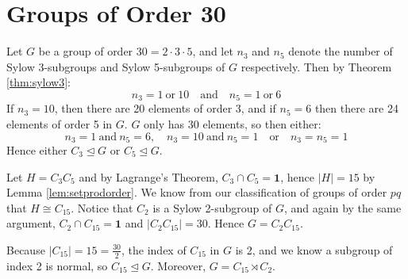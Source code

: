 \documentclass[a4paper, oneside, 12pt, final]{article}
\theoremstyle{definition}
\begin{document}
\section{Groups of Order 30}
Let \(G\) be a group of order \(30 = 2 \cdot 3 \cdot 5\), and let \(n_3\) and \(n_5\) denote the number of Sylow 3-subgroups and Sylow 5-subgroups of \(G\) respectively.
Then by Theorem \ref{thm:sylow3}:
\[n_3 = 1 \ \text{or} \ 10 \quad \text{and} \quad n_5 = 1 \ \text{or} \ 6\]
If \(n_3 = 10\), then there are 20 elements of order 3, and if \(n_5 = 6\) then there are 24 elements of order 5 in \(G\).
\(G\) only has 30 elements, so then either:
\[n_3 = 1 \ \text{and} \ n_5 = 6, \quad n_3 = 10 \ \text{and} \ n_5 = 1 \quad \text{or} \quad n_3 = n_5 = 1\]
Hence either \(C_3 \unlhd G\) or \(C_5 \unlhd G\).

Let \(H = C_3C_5\) and by Lagrange's Theorem, \(C_3 \cap C_5 = \bm{1}\), hence \(|H| = 15\) by Lemma \ref{lem:setprodorder}.
We know from our classification of groups of order \(pq\) that \(H \cong C_{15}\).
Notice that \(C_2\) is a Sylow 2-subgroup of \(G\), and again by the same argument, \(C_2 \cap C_{15} = \bm{1}\) and \(|C_2C_{15}| = 30\).
Hence \(G = C_2C_{15}\).

Because \(|C_{15}| = 15 = \frac{30}{2}\), the index of \(C_{15}\) in \(G\) is 2, and we know a subgroup of index 2 is normal, so \(C_{15} \unlhd G\).
Moreover, \(G = C_{15} \rtimes C_2\).
\end{document}
